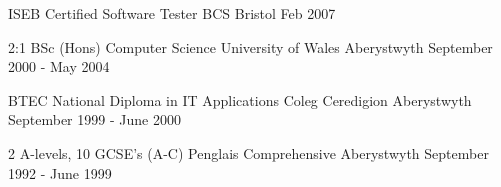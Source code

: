 

\begin{cventries}

  \cventrynobul
    {ISEB Certified Software Tester} %
    {BCS} %
    {Bristol} %
    {Feb 2007} %
    
  \cventrynobul
    {2:1 BSc (Hons) Computer Science} %
    {University of Wales} %
    {Aberystwyth} %
    {September 2000 - May 2004} %

  \cventrynobul
    {BTEC National Diploma in IT Applications} %
    {Coleg Ceredigion} %
    {Aberystwyth} %
    {September 1999 - June 2000} %

  \cventrynobul
    {2 A-levels, 10 GCSE's (A-C)} %
    {Penglais Comprehensive} %
    {Aberystwyth} %
    {September 1992 - June 1999} %

\end{cventries}
